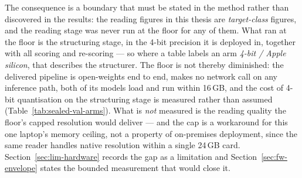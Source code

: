 The consequence is a boundary that must be stated in the method rather than discovered in the
results: the reading figures in this thesis are \emph{target-class} figures, and the reading
stage was never run at the floor for any of them. What ran at the floor is the structuring
stage, in the 4-bit precision it is deployed in, together with all scoring and re-scoring ---
so where a table labels an arm \emph{4-bit / Apple silicon}, that describes the structurer.
The floor is not thereby diminished: the delivered pipeline is open-weights end to end, makes
no network call on any inference path, both of its models load and run within 16\,\ac{GB},
and the cost of 4-bit quantisation on the structuring stage is measured rather than assumed
(Table~\ref{tab:sealed-val-arms}). What is \emph{not} measured is the reading quality the
floor's capped resolution would deliver --- and the cap is a workaround for this one
laptop's memory ceiling, not a property of on-premises deployment, since the same reader
handles native resolution within a single 24\,\ac{GB} card.
Section~\ref{sec:lim-hardware} records the gap as a limitation and Section~\ref{sec:fw-envelope} states
the bounded measurement that would close it.
